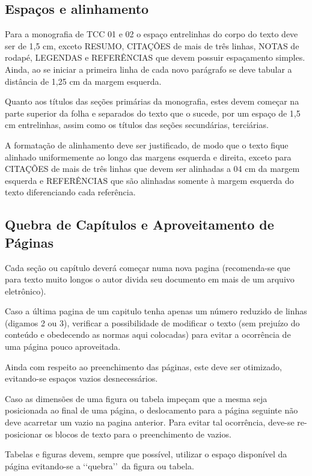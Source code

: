 \subsection{Espaços e alinhamento}

Para a monografia de TCC 01 e 02 o espaço entrelinhas do corpo do texto 
deve ser de 1,5 cm, exceto RESUMO, CITAÇÔES de mais de três linhas, NOTAS 
de rodapé, LEGENDAS e REFERÊNCIAS que devem possuir espaçamento simples. 
Ainda, ao se iniciar a primeira linha de cada novo parágrafo se deve 
tabular a distância de 1,25 cm da margem esquerda.

Quanto aos títulos das seções primárias da monografia, estes devem começar 
na parte superior da folha e separados do texto que o sucede, por um espaço 
de 1,5 cm entrelinhas, assim como os títulos das seções secundárias, 
terciárias. 

A formatação de alinhamento deve ser justificado, de modo que o texto fique 
alinhado uniformemente ao longo das margens esquerda e direita, exceto para 
CITAÇÕES de mais de três linhas que devem ser alinhadas a 04 cm da margem 
esquerda e REFERÊNCIAS que são alinhadas somente à margem esquerda do texto 
diferenciando cada referência.

\subsection{Quebra de Capítulos e Aproveitamento de Páginas}

Cada seção ou capítulo deverá começar numa nova pagina (recomenda-se que 
para texto muito longos o autor divida seu documento em mais de um arquivo 
eletrônico). 

Caso a última pagina de um capitulo tenha apenas um número reduzido de 
linhas (digamos 2 ou 3), verificar a possibilidade de modificar o texto 
(sem prejuízo do conteúdo e obedecendo as normas aqui colocadas) para 
evitar a ocorrência de uma página pouco aproveitada.

Ainda com respeito ao preenchimento das páginas, este deve ser otimizado, 
evitando-se espaços vazios desnecessários. 

Caso as dimensões de uma figura ou tabela impeçam que a mesma seja 
posicionada ao final de uma página, o deslocamento para a página seguinte 
não deve acarretar um vazio na pagina anterior. Para evitar tal ocorrência, 
deve-se re-posicionar os blocos de texto para o preenchimento de vazios. 

Tabelas e figuras devem, sempre que possível, utilizar o espaço disponível 
da página evitando-se a \lq\lq quebra\rq\rq\ da figura ou tabela. 

